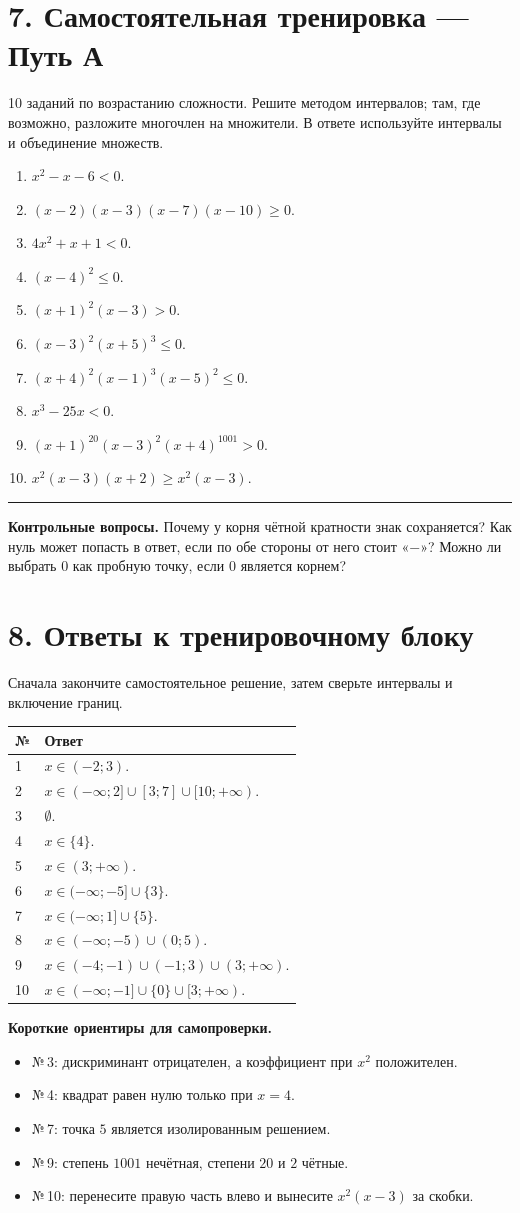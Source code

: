 \documentclass[a4paper,12pt]{article}
\newcommand{\note}[1]{{\small\color{quiet}#1}}
\newcommand{\headsec}[1]{\section*{\color{darkaccent}#1}\vspace{-6pt}{\color{hair}\rule{\linewidth}{0.55pt}}\par\vspace{2pt}}
\newcommand{\task}[1]{\item #1\par\vspace{4pt}}
\begin{document}
\clearpage
\headsec{7. Самостоятельная тренировка --- Путь А}
\note{10 заданий по возрастанию сложности. Решите методом интервалов; там, где возможно, разложите многочлен на множители. В ответе используйте интервалы и объединение множеств.}
\vspace{3mm}
\begin{enumerate}[label=\textbf{\arabic*.},itemsep=6pt]
\task{\(x^2-x-6<0.\)}
\task{\((x-2)(x-3)(x-7)(x-10)\ge0.\)}
\task{\(4x^2+x+1<0.\)}
\task{\((x-4)^2\le0.\)}
\task{\((x+1)^2(x-3)>0.\)}
\task{\((x-3)^2(x+5)^3\le0.\)}
\task{\((x+4)^2(x-1)^3(x-5)^2\le0.\)}
\task{\(x^3-25x<0.\)}
\task{\((x+1)^{20}(x-3)^2(x+4)^{1001}>0.\)}
\task{\(x^2(x-3)(x+2)\ge x^2(x-3).\)}
\end{enumerate}
\vspace{12mm}
\textcolor{quiet}{\rule{\linewidth}{.5pt}}\par
\vspace{3mm}
\textbf{Контрольные вопросы.}
Почему у корня чётной кратности знак сохраняется? Как нуль может попасть
в ответ, если по обе стороны от него стоит «\(-\)»? Можно ли выбрать \(0\)
как пробную точку, если \(0\) является корнем?

\clearpage
\headsec{8. Ответы к тренировочному блоку}
\note{Сначала закончите самостоятельное решение, затем сверьте интервалы и включение границ.}\par
\vspace{7mm}
\renewcommand{\arraystretch}{1.8}
\begin{tabularx}{\linewidth}{@{}p{12mm}X@{}}
\toprule
\textbf{№} & \textbf{Ответ} \\
\midrule
1 & \(x\in(-2;3)\).\\
2 & \(x\in(-\infty;2]\cup[3;7]\cup[10;+\infty)\).\\
3 & \(\emptyset\).\\
4 & \(x\in\{4\}\).\\
5 & \(x\in(3;+\infty)\).\\
6 & \(x\in(-\infty;-5]\cup\{3\}\).\\
7 & \(x\in(-\infty;1]\cup\{5\}\).\\
8 & \(x\in(-\infty;-5)\cup(0;5)\).\\
9 & \(x\in(-4;-1)\cup(-1;3)\cup(3;+\infty)\).\\
10 & \(x\in(-\infty;-1]\cup\{0\}\cup[3;+\infty)\).\\
\bottomrule
\end{tabularx}
\vspace{11mm}
\textbf{Короткие ориентиры для самопроверки.}
\begin{itemize}
\item №\,3: дискриминант отрицателен, а коэффициент при \(x^2\) положителен.
\item №\,4: квадрат равен нулю только при \(x=4\).
\item №\,7: точка \(5\) является изолированным решением.
\item №\,9: степень \(1001\) нечётная, степени \(20\) и \(2\) чётные.
\item №\,10: перенесите правую часть влево и вынесите \(x^2(x-3)\) за скобки.
\end{itemize}
\end{document}
